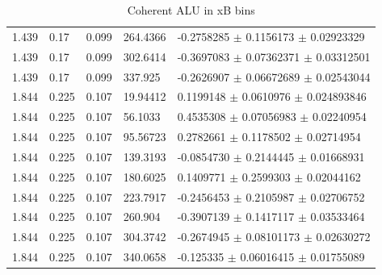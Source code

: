 \begin{table}[!h]
\begin{center}
\begin{tabular}{||l|l|l|l|l||}
        1.439 & 0.17 & 0.099 &    264.4366   &   -0.2758285  $\pm$   0.1156173     $\pm$   0.02923329    \\
        1.439 & 0.17 & 0.099 &    302.6414   &   -0.3697083  $\pm$   0.07362371    $\pm$   0.03312501    \\
        1.439 & 0.17 & 0.099 &    337.925    &   -0.2626907  $\pm$   0.06672689    $\pm$   0.02543044    \\              
         \hline                                                                         
        1.844 & 0.225 & 0.107 &   19.94412   &    0.1199148  $\pm$   0.0610976     $\pm$   0.024893846   \\
        1.844 & 0.225 & 0.107 &   56.1033    &    0.4535308  $\pm$   0.07056983    $\pm$   0.02240954    \\
        1.844 & 0.225 & 0.107 &   95.56723   &    0.2782661  $\pm$   0.1178502     $\pm$   0.02714954    \\
        1.844 & 0.225 & 0.107 &   139.3193   &   -0.0854730  $\pm$   0.2144445     $\pm$   0.01668931    \\
        1.844 & 0.225 & 0.107 &   180.6025   &    0.1409771  $\pm$   0.2599303     $\pm$   0.02044162    \\
        1.844 & 0.225 & 0.107 &   223.7917   &   -0.2456453  $\pm$   0.2105987     $\pm$   0.02706752    \\
        1.844 & 0.225 & 0.107 &   260.904    &   -0.3907139  $\pm$   0.1417117     $\pm$   0.03533464    \\
        1.844 & 0.225 & 0.107 &   304.3742   &   -0.2674945  $\pm$   0.08101173    $\pm$   0.02630272    \\
        1.844 & 0.225 & 0.107 &   340.0658   &   -0.125335   $\pm$   0.06016415    $\pm$   0.01755089    \\
         \hline  
         \hline
      \end{tabular}
      \caption{Coherent ALU in xB bins}
      \label{table:Coh_xB_BSA}
   \end{center}
\end{table}                        

